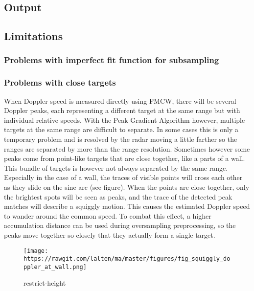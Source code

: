 \subsection{Output}\label{output}

\subsection{Limitations}\label{limitations-1}

\subsubsection{Problems with imperfect fit function for
subsampling}\label{problems-with-imperfect-fit-function-for-subsampling}

\subsubsection{Problems with close
targets}\label{problems-with-close-targets}

When Doppler speed is measured directly using FMCW, there will be
several Doppler peaks, each representing a different target at the same
range but with individual relative speeds. With the Peak Gradient
Algorithm however, multiple targets at the same range are difficult to
separate. In some cases this is only a temporary problem and is resolved
by the radar moving a little farther so the ranges are separated by more
than the range resolution. Sometimes however some peaks come from
point-like targets that are close together, like a parts of a wall. This
bundle of targets is however not always separated by the same range.
Especially in the case of a wall, the traces of visible points will
cross each other as they slide on the sine arc (see figure). When the
points are close together, only the brightest spots will be seen as
peaks, and the trace of the detected peak matches will describe a
squiggly motion. This causes the estimated Doppler speed to wander
around the common speed. To combat this effect, a higher accumulation
distance can be used during oversampling preprocessing, so the peaks
move together so closely that they actually form a single target.

\begin{figure}
\centering
\texttt{[image: https://rawgit.com/lalten/ma/master/figures/fig\_squiggly\_doppler\_at\_wall.png]}
\caption{restrict-height}
\end{figure}

